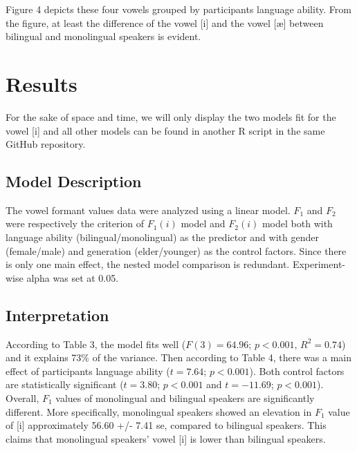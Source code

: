 \documentclass[
  man,floatsintext]{apa6}
\begin{document}
Figure 4 depicts these four vowels grouped by participants language ability. From the figure, at least the difference of the vowel {[}i{]} and the vowel {[}æ{]} between bilingual and monolingual speakers is evident.

\section{Results}\label{results}

For the sake of space and time, we will only display the two models fit for the vowel {[}i{]} and all other models can be found in another R script in the same GitHub repository.

\subsection{Model Description}\label{model-description}

The vowel formant values data were analyzed using a linear model. \(F_1\) and \(F_2\) were respectively the criterion of \(F_1(i)\) model and \(F_2(i)\) model both with language ability (bilingual/monolingual) as the predictor and with gender (female/male) and generation (elder/younger) as the control factors. Since there is only one main effect, the nested model comparison is redundant. Experiment-wise alpha was set at 0.05.

\subsection{Interpretation}\label{interpretation}

According to Table 3, the model fits well (\(F(3)=64.96\); \(p<0.001\), \(R^2=0.74\)) and it explains 73\% of the variance. Then according to Table 4, there was a main effect of participants language ability (\(t=7.64\); \(p<0.001\)). Both control factors are statistically significant (\(t=3.80\); \(p<0.001\) and \(t=-11.69\); \(p<0.001\)). Overall, \(F_1\) values of monolingual and bilingual speakers are significantly different. More specifically, monolingual speakers showed an elevation in \(F_1\) value of {[}i{]} approximately 56.60 +/- 7.41 se, compared to bilingual speakers. This claims that monolingual speakers' vowel {[}i{]} is lower than bilingual speakers.
\end{document}
